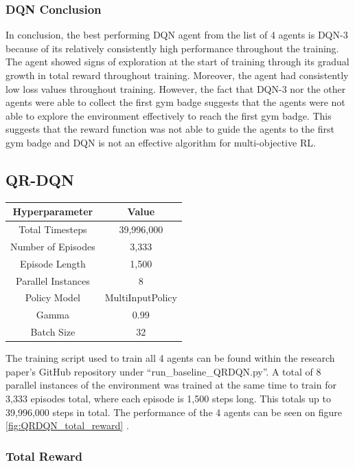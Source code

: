 \subsubsection{DQN Conclusion}

In conclusion, the best performing DQN agent from the list of 4 agents is DQN-3 because of its relatively consistently high performance throughout the training. The agent showed signs of exploration at the start of training through its gradual growth in total reward throughout training. Moreover, the agent had consistently low loss values throughout training. However, the fact that DQN-3 nor the other agents were able to collect the first gym badge suggests that the agents were not able to explore the environment effectively to reach the first gym badge. This suggests that the reward function was not able to guide the agents to the first gym badge and DQN is not an effective algorithm for multi-objective RL.

\subsection{QR-DQN}

\begin{center}
    \begin{tabular}{ |c|c| } 
     \hline
     Hyperparameter & Value \\ 
     \hline
     Total Timesteps & 39,996,000 \\
     Number of Episodes &  3,333 \\
     Episode Length & 1,500 \\ 
     Parallel Instances & 8 \\
     Policy Model & MultiInputPolicy \\
     Gamma & 0.99 \\  
     Batch Size & 32 \\
     \hline
    \end{tabular}
    \end{center}

The training script used to train all 4 agents can be found within the research paper's GitHub repository under ``run\_baseline\_QRDQN.py''. A total of 8 parallel instances of the environment was trained at the same time to train for 3,333 episodes total, where each episode is 1,500 steps long. This totals up to 39,996,000 steps in total. The performance of the 4 agents can be seen on figure \ref{fig:QRDQN_total_reward} . 

\subsubsection{Total Reward}

